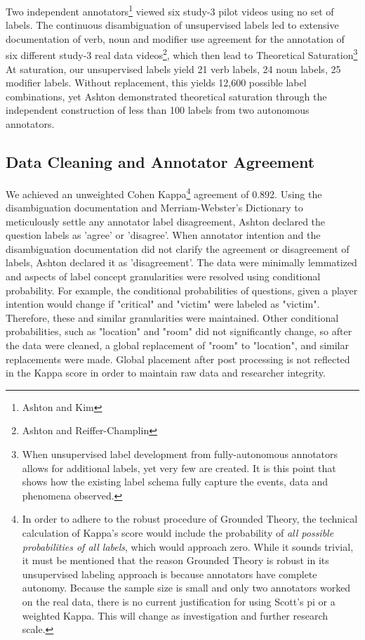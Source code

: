\documentclass[10pt]{article}
\begin{document}
Two independent annotators\footnote{Ashton and Kim} viewed six study-3 pilot videos using no set of labels. The continuous disambiguation of unsupervised labels led to extensive documentation of verb, noun and modifier use agreement for the annotation of six different study-3 real data videos\footnote{Ashton and Reiffer-Champlin}, which then lead to Theoretical Saturation\footnote{When unsupervised label development from fully-autonomous annotators allows for additional labels, yet very few are created. It is this point that shows how the existing label schema fully capture the events, data and phenomena observed.}  At saturation, our unsupervised labels yield 21 verb labels, 24 noun labels, 25 modifier labels. Without replacement, this yields 12,600 possible label combinations, yet Ashton demonstrated theoretical saturation through the independent construction of less than 100 labels from two autonomous annotators.







\subsection{Data Cleaning and Annotator Agreement}
We achieved an unweighted Cohen Kappa\footnote{In order to adhere to the robust procedure of Grounded Theory, the technical calculation of Kappa's score would include the probability of \textit{all possible probabilities of all labels}, which would approach zero. While it sounds trivial, it must be mentioned that the reason Grounded Theory is robust in its unsupervised labeling approach is because annotators have complete autonomy. Because the sample size is small and only two annotators worked on the real data, there is no current justification for using Scott's pi or a weighted Kappa. This will change as investigation and further research scale.} agreement of 0.892. Using the disambiguation documentation and Merriam-Webster's Dictionary to meticulously settle any annotator label disagreement, Ashton declared the question labels as 'agree' or 'disagree'. When annotator intention and the disambiguation documentation did not clarify the agreement or disagreement of labels, Ashton declared it as 'disagreement'. The data were minimally lemmatized and aspects of label concept granularities were resolved using conditional probability. For example, the conditional probabilities of questions, given a player intention would change if "critical" and "victim" were labeled as "victim". Therefore, these and similar granularities were maintained. Other conditional probabilities, such as "location" and "room" did not significantly change, so after the data were cleaned, a global replacement of "room" to "location", and similar replacements were made. Global placement after post processing is not reflected in the Kappa score in order to maintain raw data and researcher integrity.
\end{document}
